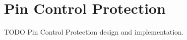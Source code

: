 \chapter{Pin Control Protection}
\label{chap:design}

TODO Pin Control Protection design and implementation.

